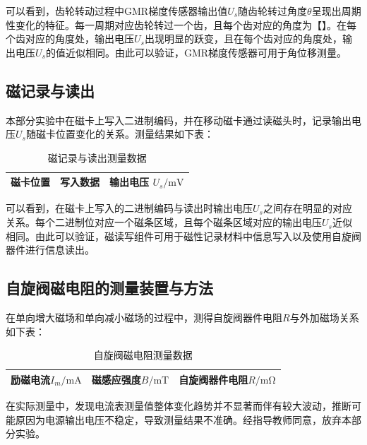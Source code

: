 \documentclass{thuemp}
\begin{document}
可以看到，齿轮转动过程中GMR梯度传感器输出值$U_s$随齿轮转过角度$\theta$呈现出周期性变化的特征。每一周期对应齿轮转过一个齿，且每个齿对应的角度为【】。在每个齿对应的角度处，输出电压$U_s$出现明显的跃变，且在每个齿对应的角度处，输出电压$U_s$的值近似相同。由此可以验证，GMR梯度传感器可用于角位移测量。

\subsection{磁记录与读出}

本部分实验中在磁卡上写入二进制编码，并在移动磁卡通过读磁头时，记录输出电压$U_s$随磁卡位置变化的关系。测量结果如下表：

\begin{table}[H]
    \centering
    \captionnamefont{\wuhao\bf\heiti}
    \captiontitlefont{\wuhao\bf\heiti}
    \caption{磁记录与读出测量数据} \label{tab:magnetic_record}
    \liuhao
    \begin{tabular}{|c|c|c|}
        \toprule
        磁卡位置 & 写入数据& 输出电压 $U_s/\mathrm{mV}$ \\ \hline
        \midrule
        \bottomrule
    \end{tabular}
\end{table}

可以看到，在磁卡上写入的二进制编码与读出时输出电压$U_s$之间存在明显的对应关系。每个二进制位对应一个磁条区域，且每个磁条区域对应的输出电压$U_s$近似相同。由此可以验证，磁读写组件可用于磁性记录材料中信息写入以及使用自旋阀器件进行信息读出。

\subsection{自旋阀磁电阻的测量装置与方法}
在单向增大磁场和单向减小磁场的过程中，测得自旋阀器件电阻$R$与外加磁场关系如下表：
\begin{table}[H]
    \centering
    \captionnamefont{\wuhao\bf\heiti}
    \captiontitlefont{\wuhao\bf\heiti}
    \caption{自旋阀磁电阻测量数据} \label{tab:spin_valve}
    \liuhao
    \begin{tabular}{|c|c|c|}
        \toprule
        励磁电流$I_m/\mathrm{mA}$ & 磁感应强度$B/\mathrm{mT}$ & 自旋阀器件电阻$R/\mathrm{m\Omega}$ \\ \hline
        \midrule
        \bottomrule
    \end{tabular}
\end{table}

在实际测量中，发现电流表测量值整体变化趋势并不显著而伴有较大波动，推断可能原因为电源输出电压不稳定，导致测量结果不准确。经指导教师同意，放弃本部分实验。
\end{document}

